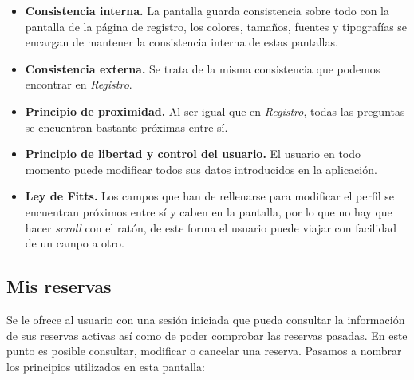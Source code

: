 \begin{itemize}
    \item \textbf{Consistencia interna.} La pantalla guarda consistencia sobre todo con la pantalla de la página de registro,
        los colores, tamaños, fuentes y tipografías se encargan de mantener la consistencia interna de estas pantallas.
    \item \textbf{Consistencia externa.} Se trata de la misma consistencia que podemos encontrar en \textit{Registro}.
    \item \textbf{Principio de proximidad.} Al ser igual que en \textit{Registro}, todas las preguntas se encuentran
        bastante próximas entre sí.
    \item \textbf{Principio de libertad y control del usuario.} El usuario en todo momento puede modificar todos
        sus datos introducidos en la aplicación.
    \item \textbf{Ley de Fitts.} Los campos que han de rellenarse para modificar el perfil se encuentran próximos
        entre sí y caben en la pantalla, por lo que no hay que hacer \textit{scroll} con el ratón, de este forma
        el usuario puede viajar con facilidad de un campo a otro.
\end{itemize}

\subsection*{Mis reservas}

Se le ofrece al usuario con una sesión iniciada que pueda consultar la información de sus reservas
activas así como de poder comprobar las reservas pasadas. En este punto es posible consultar, modificar o cancelar
una reserva. Pasamos a nombrar los principios utilizados en esta pantalla: 

